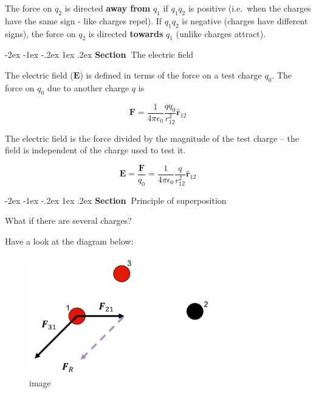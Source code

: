\documentclass[
]{book}
\makeatletter
\renewcommand\section{%
\@startsection{section}{1}{\z@}%
              {-2ex \@plus -1ex \@minus -.2ex}%
              {1ex \@plus .2ex}%
              {\sffamily\bfseries\large\noindent Section~}}
\numberwithin{equation}{section}
\makeatother
\begin{document}
The force on \(q_2\) is directed \textbf{away from} \(q_1\) if \(q_1 q_2\) is
positive (i.e.~when the charges have the same sign - like charges
repel). If \(q_1 q_2\) is negative (charges have different signs), the
force on \(q_2\) is directed \textbf{towards} \(q_1\) (unlike charges attract).

\hypertarget{the-electric-field}{%
\section{The electric field}\label{the-electric-field}}

The electric field (\(\mathbf{E}\)) is defined in terms of the force on a test
charge \(q_0\). The force on \(q_0\) due to another charge \(q\) is

\begin{equation}
\label{eq:forceQ0}
\mathbf{F} = \frac{1}{4\pi \epsilon_0} \frac{q q_0}{r_{12}^2} \hat{\mathbf{r}}_{12}
\end{equation}

The electric field is the force divided by the magnitude of the test
charge -- the field is independent of the charge used to test it.

\begin{equation}
\label{eq:fieldQ}
\mathbf{E} = \frac{\mathbf{F}}{q_0} = \frac{1}{4\pi \epsilon_0} \frac{q}{r_{12}^2} \hat{\mathbf{r}}_{12}
\end{equation}

\hypertarget{principle-of-superposition}{%
\section{Principle of superposition}\label{principle-of-superposition}}

What if there are several charges?

Have a look at the diagram below:

\begin{figure}
\centering
\includegraphics[width=80mm,height=\textheight]{Figures/superposition.png}
\caption{image}
\end{figure}
\end{document}
